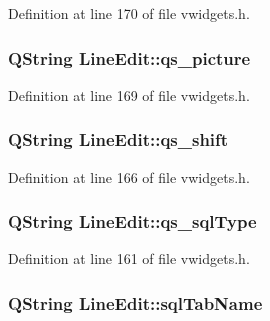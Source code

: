 Definition at line 170 of file vwidgets.h.

\hypertarget{classLineEdit_aa7911a11a6d620f20248e968c093bd94}{
\subsubsection[{qs\_\-picture}]{\setlength{\rightskip}{0pt plus 5cm}QString {\bf LineEdit::qs\_\-picture}}}
\label{classLineEdit_aa7911a11a6d620f20248e968c093bd94}


Definition at line 169 of file vwidgets.h.

\hypertarget{classLineEdit_ae554482e3fa80ec2695a79850b36bf1b}{
\subsubsection[{qs\_\-shift}]{\setlength{\rightskip}{0pt plus 5cm}QString {\bf LineEdit::qs\_\-shift}}}
\label{classLineEdit_ae554482e3fa80ec2695a79850b36bf1b}


Definition at line 166 of file vwidgets.h.

\hypertarget{classLineEdit_a662654e1d1126e311ba37ab357f90ef3}{
\subsubsection[{qs\_\-sqlType}]{\setlength{\rightskip}{0pt plus 5cm}QString {\bf LineEdit::qs\_\-sqlType}}}
\label{classLineEdit_a662654e1d1126e311ba37ab357f90ef3}


Definition at line 161 of file vwidgets.h.

\hypertarget{classLineEdit_ac7a4f4fcd5b7f40f66c47ff64d66f7ec}{
\subsubsection[{sqlTabName}]{\setlength{\rightskip}{0pt plus 5cm}QString {\bf LineEdit::sqlTabName}}}
\label{classLineEdit_ac7a4f4fcd5b7f40f66c47ff64d66f7ec}


